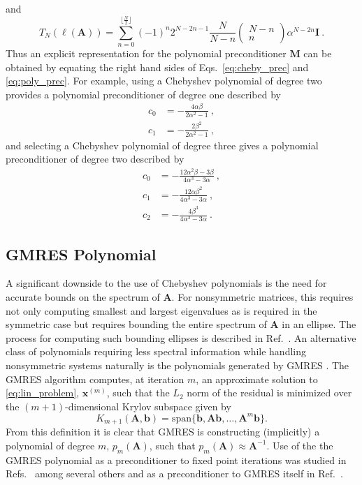 \documentclass[10pt]{article}
\newcommand{\bx}{\ensuremath{\mathbf{x}}}
\newcommand{\bb}{\ensuremath{\mathbf{b}}}
\newcommand{\bA}{\ensuremath{\mathbf{A}}}
\newcommand{\bM}{\ensuremath{\mathbf{M}}}
\newcommand{\bI}{\ensuremath{\mathbf{I}}}
\begin{document}
and
\begin{equation}
T_N \left( \ell(\bA) \right) = \sum_{n=0}^{\lfloor \frac{N}{2} \rfloor} \left( -1 \right)^n 2^{N - 2n -1} \frac{N}{N-n}
\begin{pmatrix} N-n \\ n \end{pmatrix} \alpha^{N-2n} \bI \:.
\end{equation}
Thus an explicit representation for the polynomial preconditioner $\bM$ can
be obtained by equating the right hand sides of Eqs.~\eqref{eq:cheby_prec}
and \eqref{eq:poly_prec}.  For example, using a Chebyshev polynomial of
degree two provides a polynomial preconditioner of degree one described by
\begin{equation}
\begin{aligned}
c_0 &= - \frac{4 \alpha \beta}{2 \alpha^2 -1} \:, \\
c_1 &= - \frac{2 \beta^2}{2 \alpha^2 - 1} \:,
\end{aligned}
\end{equation}
and selecting a Chebyshev polynomial of degree three gives a polynomial
preconditioner of degree two described by
\begin{equation}
\begin{aligned}
c_0 &= - \frac{12 \alpha^2 \beta - 3 \beta}{4 \alpha^3 - 3 \alpha} \:, \\
c_1 &= - \frac{12 \alpha \beta^2}{4 \alpha^3 - 3 \alpha} \:, \\
c_2 &= - \frac{4 \beta^3}{4 \alpha^3 - 3 \alpha} \:.
\end{aligned}
\end{equation}

\subsection{GMRES Polynomial}
\label{subsec:gmres}

A significant downside to the use of Chebyshev polynomials is the need for
accurate bounds on the spectrum of $\bA$.  For nonsymmetric matrices,
this requires not only computing smallest and largest eigenvalues as is
required in the symmetric case but requires
bounding the entire spectrum of $\bA$ in an ellipse.  The process for
computing such bounding ellipses is described in Ref.~\cite{manteuffel_77}.
An alternative class of polynomials requiring less spectral information
while handling nonsymmetric systems naturally is the polynomials generated
by GMRES \cite{saad_86}.  The GMRES algorithm computes, at iteration $m$,
an approximate solution to \eqref{eq:lin_problem}, $\bx^{(m)}$, 
such that the $L_2$ norm of the residual
is minimized over the $(m+1)$-dimensional Krylov subspace given by
\begin{equation}
K_{m+1}(\bA,\bb) = \text{span}\{ \bb, \bA \bb, \ldots, \bA^{m} \bb \}.
\end{equation}
From this definition it is clear that GMRES is constructing (implicitly)
a polynomial of degree $m$, $p_m(\bA)$, such that $p_m(\bA) \approx \bA^{-1}$.
Use of the the GMRES polynomial as a preconditioner to fixed point iterations
was studied in Refs.~\cite{nachtigal_92,joubert_94} among several others
and as a preconditioner to {GMRES} itself in Ref.~\cite{liu_14}.
\end{document}
